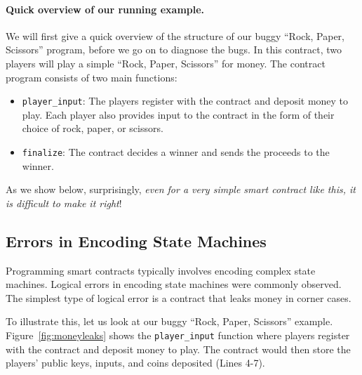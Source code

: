 \documentclass[10pt,twocolumn,letterpaper]{article}
\newcommand{\elaine}[1]{{\color{red}{[elaine: #1]}}}
\newcommand{\ignore}[1]{}
\begin{document}
\paragraph{Quick overview of our running example.}
We will first give a quick overview of the structure
of our buggy ``Rock, Paper, Scissors'' program, before
we go on to diagnose the bugs.
In this contract, two players 
will play a simple 
``Rock, Paper, Scissors''
for money. 
The contract program consists of two main functions:
\begin{itemize}
\item
{\tt player\_input}:
The players register with the contract
and deposit money to play. Each player 
also provides input to the contract 
in the form of their choice of rock, paper, or scissors.
\item
{\tt finalize}:
The contract decides a winner
and sends the proceeds to the winner. 
\end{itemize}

As we show below, 
surprisingly, {\it even for a very simple smart contract like this, 
it is difficult 
to make it right}!

\elaine{emphasize this in the intro too.}


\ignore{
In this section, we'll explore the security and incentive alignment pitfalls in designing a smart contract. We'll use an easy-to-understand application as a running example, based on a Rock-Paper-Scissors game. We then analyze a plausible (but subtly buggy) initial implementation, pointing out its flaws. Mistakes resembling these were actually observed in our Smart Contract Programming Lab in ``CMSC 414 - Undergraduate Security''. vThis section is centered around the exercises. We provide hints to guide the reader towards discovering how to improve on them. Our ``reference'' solution can be found in the accompanying materials.
}


\subsection{Errors in Encoding State Machines}

Programming smart contracts typically involves
encoding complex state machines.
Logical errors
in encoding state machines were commonly observed.
The simplest type of logical error is a contract
that leaks money in corner cases.


To illustrate this, let us look at our buggy
``Rock, Paper, Scissors'' example.
Figure~\ref{fig:moneyleaks}
shows the {\tt player\_input} function
where players register with the contract and  
deposit money to play.
The contract would then store the players'
public keys, inputs,
and coins deposited (Lines 4-7).
\end{document}
